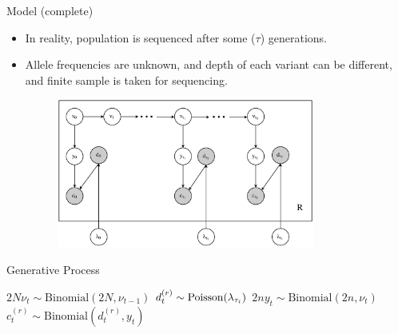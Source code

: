 \documentclass[t]{beamer} %
\begin{document}
\begin{frame}{ Model (complete)}
	\begin{itemize}
		\item  In reality, population is sequenced after some ($\tau$) 
		generations.\\
		\pause
		\item Allele frequencies are unknown, and depth of each variant can be 
		different, and finite sample is taken for sequencing.
		\begin{figure}
	\includegraphics[trim={.05in 0in 0.0in 
		0in},clip,width=0.8\textwidth]{../figures/HMMGM}
\end{figure}
	\end{itemize}
\end{frame}

\begin{frame}{ Generative Process}
\begin{algorithm}[H]
\DontPrintSemicolon
\SetAlgoNoLine
{}
{
	{
		$2N\nu_t \sim \text{Binomial}({2N},{\nu_{t-1}})$\;
		{
			$d^{(r)}_{t} \sim \operatorname{Poisson}(\lambda_{\tau_i})$ \;
			$2ny_t \sim \text{Binomial}({2n},{\nu_{t}})$\;  
			$c^{(r)}_{t} \sim \text{Binomial}(d^{(r)}_{t},{y_{t}})$\; 
		}
	}
}
\caption{The Generative Process for Dynamic Pool-seq Data.} 
\label{proc:arya}
\end{algorithm}	
\end{frame}
\end{document}
